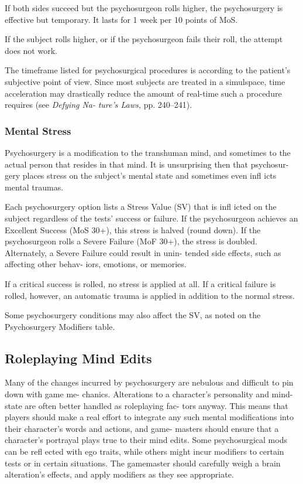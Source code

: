 If both sides succeed but the psychosurgeon rolls 
higher, the psychosurgery is effective but temporary. It 
lasts for 1 week per 10 points of MoS.

If the subject rolls higher, or if the psychosurgeon 
fails their roll, the attempt does not work.

The timeframe listed for psychosurgical procedures 
is according to the patient's subjective point of view. 
Since most subjects are treated in a simulspace, time 
acceleration may drastically reduce the amount of 
real-time such a procedure requires (see \textit{Defying Na-}
\textit{ture's Laws,} pp. 240–241).

\subsubsection{Mental Stress}

Psychosurgery is a modification to the transhuman 
mind, and sometimes to the actual person that resides 
in that mind. It is unsurprising then that psychosur-
gery places stress on the subject's mental state and 
sometimes even infl icts mental traumas.

Each psychosurgery option lists a Stress Value 
(SV) that is infl icted on the subject regardless of 
the tests' success or failure. If the psychosurgeon 
achieves an Excellent Success (MoS 30+), this stress 
is halved (round down). If the psychosurgeon rolls 
a Severe Failure (MoF 30+), the stress is doubled. 
Alternately, a Severe Failure could result in unin-
tended side effects, such as affecting other behav-
iors, emotions, or memories.

If a critical success is rolled, no stress is applied at 
all. If a critical failure is rolled, however, an automatic 
trauma is applied in addition to the normal stress.

Some psychosurgery conditions may also affect the 
SV, as noted on the Psychosurgery Modifiers table.

\subsection{Roleplaying Mind Edits}

Many of the changes incurred by psychosurgery are 
nebulous and difficult to pin down with game me-
chanics. Alterations to a character's personality and 
mind-state are often better handled as roleplaying fac-
tors anyway. This means that players should make a 
real effort to integrate any such mental modifications 
into their character's words and actions, and game-
masters should ensure that a character's portrayal 
plays true to their mind edits. Some psychosurgical 
mods can be refl ected with ego traits, while others 
might incur modifiers to certain tests or in certain 
situations. The gamemaster should carefully weigh a 
brain alteration's effects, and apply modifiers as they 
see appropriate.

